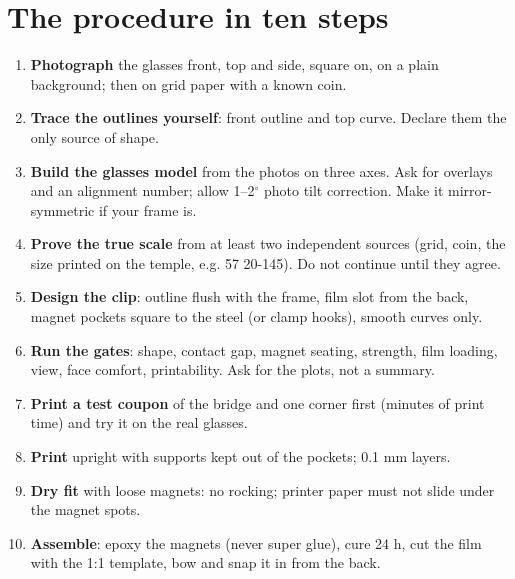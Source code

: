 \documentclass[10pt,a4paper,oneside]{article}
\begin{document}
\section{The procedure in ten steps}
\begin{center}
\end{center}
\begin{enumerate}[leftmargin=18pt,label=\textbf{\sffamily\color{teal}\arabic*.}]
\item \textbf{Photograph} the glasses front, top and side, square on, on a plain background; then on grid paper with a known coin.
\item \textbf{Trace the outlines yourself}: front outline and top curve. Declare them the only source of shape.
\item \textbf{Build the glasses model} from the photos on three axes. Ask for overlays and an alignment number; allow 1--2$^\circ$ photo tilt correction. Make it mirror-symmetric if your frame is.
\item \textbf{Prove the true scale} from at least two independent sources (grid, coin, the size printed on the temple, e.g. 57\,\fbox{\rule{0pt}{1ex}}\,20-145). Do not continue until they agree.
\item \textbf{Design the clip}: outline flush with the frame, film slot from the back, magnet pockets square to the steel (or clamp hooks), smooth curves only.
\item \textbf{Run the gates}: shape, contact gap, magnet seating, strength, film loading, view, face comfort, printability. Ask for the plots, not a summary.
\item \textbf{Print a test coupon} of the bridge and one corner first (minutes of print time) and try it on the real glasses.
\item \textbf{Print} upright with supports kept out of the pockets; 0.1 mm layers.
\item \textbf{Dry fit} with loose magnets: no rocking; printer paper must not slide under the magnet spots.
\item \textbf{Assemble}: epoxy the magnets (never super glue), cure 24 h, cut the film with the 1:1 template, bow and snap it in from the back.
\end{enumerate}
\end{document}
